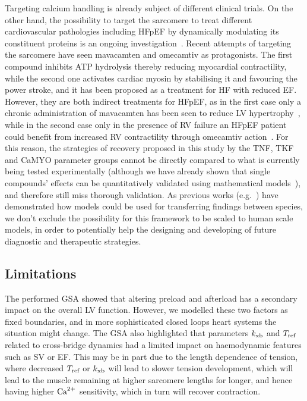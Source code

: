 \vspace{0.2cm}
Targeting calcium handling is already subject of different clinical trials. On the other hand, the possibility to target the sarcomere to treat different cardiovascular pathologies including HFpEF by dynamically modulating its constituent proteins is an ongoing investigation~\cite{Patel:2019}. Recent attempts of targeting the sarcomere have seen mavacamten and omecamtiv as protagonists. The first compound inhibits ATP hydrolysis thereby reducing myocardial contractility, while the second one activates cardiac myosin by stabilising it and favouring the power stroke, and it has been proposed as a treatment for HF with reduced EF. However, they are both indirect treatments for HFpEF, as in the first case only a chronic administration of mavacamten has been seen to reduce LV hypertrophy~\cite{Green:2016}, while in the second case only in the presence of RV failure an HFpEF patient could benefit from increased RV contractility through omecamtiv action~\cite{Planelles-Herrero:2017}. For this reason, the strategies of recovery proposed in this study by the TNF, TKF and CaMYO parameter groups cannot be directly compared to what is currently being tested experimentally (although we have already shown that single compounds' effects can be quantitatively validated using mathematical models~\cite{Longobardi:2021}), and therefore still miss thorough validation. As previous works (e.g.~\cite{Fernandez-Chas:2018}) have demonstrated how models could be used for transferring findings between species, we don't exclude the possibility for this framework to be scaled to human scale models, in order to potentially help the designing and developing of future diagnostic and therapeutic strategies.


%
%
%
\subsection{Limitations}\label{sec:ch7limitations}
The performed GSA showed that altering preload and afterload has a secondary impact on the overall LV function. However, we modelled these two factors as fixed boundaries, and in more sophisticated closed loops heart systems the situation might change. The GSA also highlighted that parameters $k_{\textrm{xb}}$ and $T_{\textrm{ref}}$ related to cross-bridge dynamics had a limited impact on haemodynamic features such as SV or EF. This may be in part due to the length dependence of tension, where decreased $T_{\textrm{ref}}$ or $k_{\textrm{xb}}$ will lead to slower tension development, which will lead to the muscle remaining at higher sarcomere lengths for longer, and hence having higher $\textrm{Ca}^{2+}$ sensitivity, which in turn will recover contraction.

